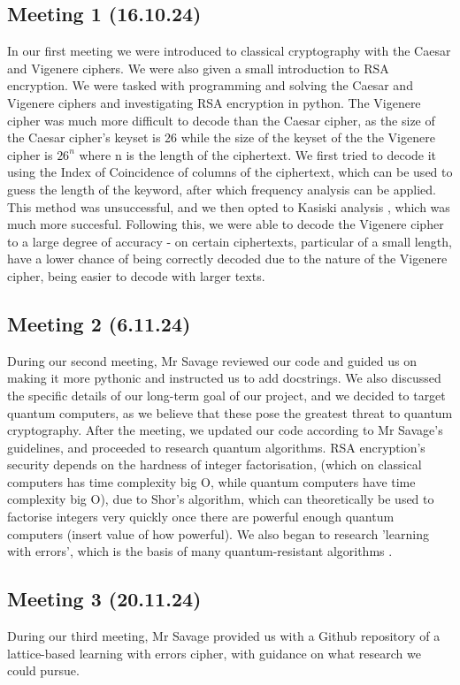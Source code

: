 \documentclass{article}
\begin{document}
\subsection{Meeting 1 (16.10.24)}
In our first meeting we were introduced to classical cryptography with the Caesar and Vigenere ciphers. We were also given a small introduction to RSA encryption. We were tasked with programming and solving the Caesar and Vigenere ciphers and investigating RSA encryption in python. The Vigenere cipher was much more difficult to decode than the Caesar cipher, as the size of the Caesar cipher's keyset is 26 while the size of the keyset of the the Vigenere cipher is $ 26^n $ where n is the length of the ciphertext. We first tried to decode it using the Index of Coincidence \cite{ioc} of columns of the ciphertext, which can be used to guess the length of the keyword, after which frequency analysis can be applied. This method was unsuccessful, and we then opted to Kasiski analysis \cite{kasiski}, which was much more succesful. Following this, we were able to decode the Vigenere cipher to a large degree of accuracy - on certain ciphertexts, particular of a small length, have a lower chance of being correctly decoded due to the nature of the Vigenere cipher, being easier to decode with larger texts.

\subsection{Meeting 2 (6.11.24)}
During our second meeting, Mr Savage reviewed our code and guided us on making it more pythonic and instructed us to add docstrings. We also discussed the specific details of our long-term goal of our project, and we decided to target quantum computers, as we believe that these pose the greatest threat to quantum cryptography. After the meeting, we updated our code according to Mr Savage's guidelines, and proceeded to research quantum algorithms. RSA encryption's security depends on the hardness of integer factorisation, (which on classical computers has time complexity big O, while quantum computers have time complexity big O), due to Shor's algorithm, which can theoretically be used to factorise integers very quickly once there are powerful enough quantum computers (insert value of how powerful). We also began to research 'learning with errors', which is the basis of many quantum-resistant algorithms \cite{LWE}.

\subsection{Meeting 3 (20.11.24)}
During our third meeting, Mr Savage provided us with a Github repository of a lattice-based learning with errors cipher, with guidance on what research we could pursue.




\end{document}

